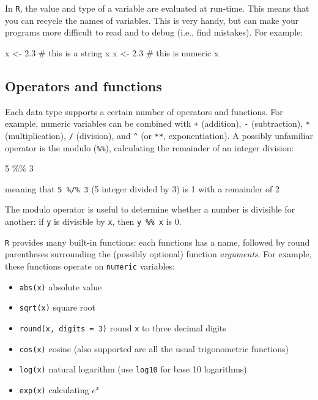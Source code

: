\documentclass[
  letterpaper,
  DIV=11,
  numbers=noendperiod]{scrreprt}
\newenvironment{Shaded}{\begin{snugshade}}{\end{snugshade}}
\newcommand{\NormalTok}[1]{\textcolor[rgb]{0.00,0.23,0.31}{#1}}
\providecommand{\tightlist}{%
  \setlength{\itemsep}{0pt}\setlength{\parskip}{0pt}}\usepackage{longtable,booktabs,array}
\begin{document}
In \texttt{R}, the value and type of a variable are evaluated at
run-time. This means that you can recycle the names of variables. This
is very handy, but can make your programs more difficult to read and to
debug (i.e., find mistakes). For example:

\begin{Shaded}
\begin{Highlighting}[]
\NormalTok{x \textless{}{-} \textquotesingle{}2.3\textquotesingle{} \# this is a string}
\NormalTok{x}
\NormalTok{x \textless{}{-} 2.3 \# this is numeric}
\NormalTok{x}
\end{Highlighting}
\end{Shaded}

\subsection*{Operators and functions}\label{operators-and-functions}

Each data type supports a certain number of operators and functions. For
example, numeric variables can be combined with \texttt{+} (addition),
\texttt{-} (subtraction), \texttt{*} (multiplication), \texttt{/}
(division), and \texttt{\^{}} (or \texttt{**}, exponentiation). A
possibly unfamiliar operator is the modulo (\texttt{\%\%}), calculating
the remainder of an integer division:

\begin{Shaded}
\begin{Highlighting}[]
\NormalTok{5 \%\% 3}
\end{Highlighting}
\end{Shaded}

meaning that \texttt{5\ \%/\%\ 3} (5 integer divided by 3) is 1 with a
remainder of 2

The modulo operator is useful to determine whether a number is divisible
for another: if \texttt{y} is divisible by \texttt{x}, then
\texttt{y\ \%\%\ x} is 0.

\texttt{R} provides many built-in functions: each functions has a name,
followed by round parentheses surrounding the (possibly optional)
function \emph{arguments}. For example, these functions operate on
\texttt{numeric} variables:

\begin{itemize}
\tightlist
\item
  \texttt{abs(x)} absolute value
\item
  \texttt{sqrt(x)} square root
\item
  \texttt{round(x,\ digits\ =\ 3)} round \texttt{x} to three decimal
  digits
\item
  \texttt{cos(x)} cosine (also supported are all the usual trigonometric
  functions)
\item
  \texttt{log(x)} natural logarithm (use \texttt{log10} for base 10
  logarithms)
\item
  \texttt{exp(x)} calculating \(e^x\)
\end{itemize}
\end{document}
